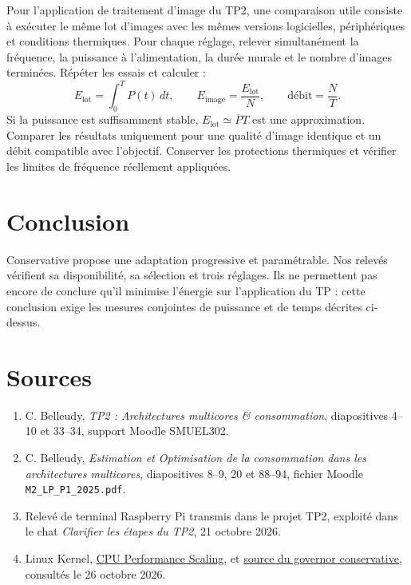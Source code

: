 \documentclass[11pt,a4paper]{article}
\begin{document}
Pour l'application de traitement d'image du TP2, une comparaison utile consiste à exécuter le même lot d'images avec les mêmes versions logicielles, périphériques et conditions thermiques. Pour chaque réglage, relever simultanément la fréquence, la puissance à l'alimentation, la durée murale et le nombre d'images terminées. Répéter les essais et calculer :
\[
 E_{\mathrm{lot}}=\int_0^T P(t)\,dt,\qquad
 E_{\mathrm{image}}=\frac{E_{\mathrm{lot}}}{N},\qquad
 \mathrm{débit}=\frac{N}{T}.
\]
Si la puissance est suffisamment stable, $E_{\mathrm{lot}}\simeq\overline P T$ est une approximation. Comparer les résultats uniquement pour une qualité d'image identique et un débit compatible avec l'objectif. Conserver les protections thermiques et vérifier les limites de fréquence réellement appliquées.

\section{Conclusion}
Conservative propose une adaptation progressive et paramétrable. Nos relevés vérifient sa disponibilité, sa sélection et trois réglages. Ils ne permettent pas encore de conclure qu'il minimise l'énergie sur l'application du TP : cette conclusion exige les mesures conjointes de puissance et de temps décrites ci-dessus.

\small
\section*{Sources}
\begin{enumerate}
\item C. Belleudy, \emph{TP2 : Architectures multicores \& consommation}, diapositives 4--10 et 33--34, support Moodle SMUEL302.
\item C. Belleudy, \emph{Estimation et Optimisation de la consommation dans les architectures multicores}, diapositives 8--9, 20 et 88--94, fichier Moodle \texttt{M2\_LP\_P1\_2025.pdf}.
\item Relevé de terminal Raspberry Pi transmis dans le projet TP2, exploité dans le chat \emph{Clarifier les étapes du TP2}, 21 octobre 2026.
\item Linux Kernel, \href{https://www.kernel.org/doc/html/latest/admin-guide/pm/cpufreq.html}{CPU Performance Scaling}, et \href{https://github.com/torvalds/linux/blob/master/drivers/cpufreq/cpufreq_conservative.c}{source du governor conservative}, consultés le 26 octobre 2026.
\end{enumerate}
\end{document}
